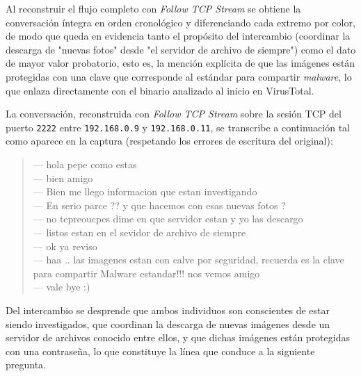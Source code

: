 
\begin{analisis}
  Al reconstruir el flujo completo con \emph{Follow TCP Stream} se obtiene la conversación íntegra en orden cronológico y diferenciando cada extremo por color, de modo que queda en evidencia tanto el propósito del intercambio (coordinar la descarga de "nuevas fotos" desde "el servidor de archivo de siempre") como el dato de mayor valor probatorio, esto es, la mención explícita de que las imágenes están protegidas con una clave que corresponde al estándar para compartir \emph{malware}, lo que enlaza directamente con el binario analizado al inicio en VirusTotal.
\end{analisis}

\begin{respuesta}
  La conversación, reconstruida con \emph{Follow TCP Stream} sobre la sesión TCP del puerto \texttt{2222} entre \texttt{192.168.0.9} y \texttt{192.168.0.11}, se transcribe a continuación tal como aparece en la captura (respetando los errores de escritura del original):
  \begin{quote}\ttfamily\small
    --- hola pepe como estas\\
    --- bien amigo\\
    --- Bien me llego informacion que estan investigando\\
    --- En serio parce ?? y que hacemos con esas nuevas fotos ?\\
    --- no tepreoucpes dime en que servidor estan y yo las descargo\\
    --- listos estan en el sevidor de archivo de siempre\\
    --- ok ya reviso\\
    --- haa .. las imagenes estan con calve por seguridad, recuerda es la clave para compartir Malware estandar!!! nos vemos amigo\\
    --- vale bye :)
  \end{quote}
  Del intercambio se desprende que ambos individuos son conscientes de estar siendo investigados, que coordinan la descarga de nuevas imágenes desde un servidor de archivos conocido entre ellos, y que dichas imágenes están protegidas con una contraseña, lo que constituye la línea que conduce a la siguiente pregunta.
\end{respuesta}


